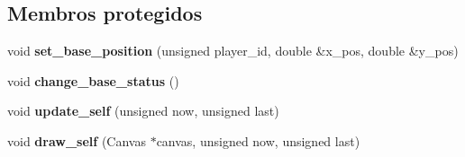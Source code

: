 \subsection*{Membros protegidos}
\begin{DoxyCompactItemize}
\item 
\mbox{\label{classBase_a3345e924d2f7897f0818d476a990f2a2}} 
void {\bfseries set\+\_\+base\+\_\+position} (unsigned player\+\_\+id, double \&x\+\_\+pos, double \&y\+\_\+pos)
\item 
\mbox{\label{classBase_af95cdc748f2f72e35ff9e42a8a44eefe}} 
void {\bfseries change\+\_\+base\+\_\+status} ()
\item 
\mbox{\label{classBase_a04c92d862951b17a9f96ff43c738c2f9}} 
void {\bfseries update\+\_\+self} (unsigned now, unsigned last)
\item 
\mbox{\label{classBase_a63a037721de1f96a8197857f7451aba7}} 
void {\bfseries draw\+\_\+self} (Canvas $\ast$canvas, unsigned now, unsigned last)
\end{DoxyCompactItemize}
